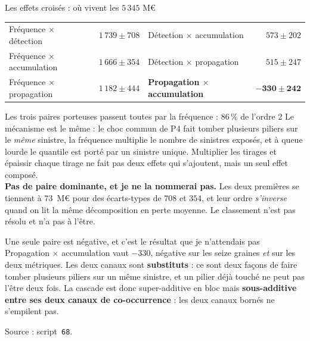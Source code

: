 \documentclass[11pt]{beamer}
\begin{document}
\begin{frame}{Les effets croisés : où vivent les \texorpdfstring{$5\,345$}{5345} M\euro}
\scriptsize
\begin{center}
\begin{tabular}{@{}l r@{\hskip 2em}l r@{}}
\toprule
Fréquence $\times$ détection & $1\,739\pm708$ & Détection $\times$ accumulation & $573\pm202$ \\
Fréquence $\times$ accumulation & $1\,666\pm354$ & Détection $\times$ propagation & $515\pm247$ \\
Fréquence $\times$ propagation & $1\,182\pm444$ & \textbf{Propagation $\times$ accumulation} & $\mathbf{-330\pm242}$ \\
\bottomrule
\end{tabular}
\end{center}
\vspace{-1mm}
\begin{block}{Les trois paires porteuses passent toutes par la fréquence : $86\,\%$ de l'ordre 2}
Le mécanisme est le même : le choc commun de P4 fait tomber plusieurs piliers sur le \emph{même}
sinistre, la fréquence multiplie le nombre de sinistres exposés, et à queue lourde le quantile est
porté par un sinistre unique. Multiplier les tirages et épaissir chaque tirage ne fait pas deux
effets qui s'ajoutent, mais un seul effet composé.\\[3pt]
\textbf{Pas de paire dominante, et je ne la nommerai pas.} Les deux premières se tiennent à
$73$~M\euro{} pour des écarts-types de $708$ et $354$, et leur ordre \emph{s'inverse} quand on lit
la même décomposition en perte moyenne. Le classement n'est pas résolu et n'a pas à l'être.
\end{block}
\vspace{-1mm}
\begin{block}{Une seule paire est négative, et c'est le résultat que je n'attendais pas}
Propagation $\times$ accumulation vaut $-330$, négative sur les seize graines \emph{et} sur les
deux métriques. Les deux canaux sont \textbf{substituts} : ce sont deux façons de faire tomber
plusieurs piliers sur un même sinistre, et un pilier déjà touché ne peut pas l'être deux fois. La
cascade est donc super-additive en bloc mais \textbf{sous-additive entre ses deux canaux de
co-occurrence} : les deux canaux bornés ne s'empilent pas.
\end{block}
\vspace{-1mm}
{\scriptsize Source : script~\texttt{68}.}
\end{frame}
\end{document}
